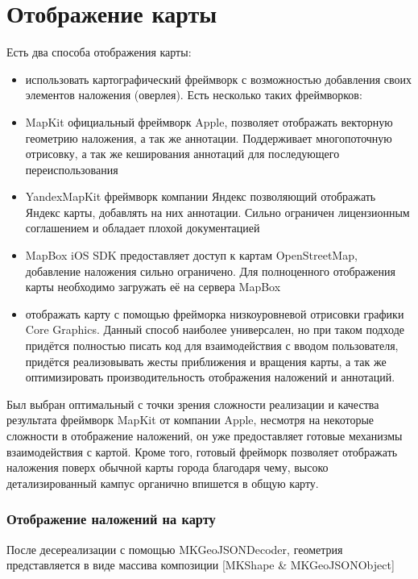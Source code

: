   \section{Отображение карты}
    Есть два способа отображения карты:
    \begin{itemize}
      \item использовать картографический фреймворк с возможностью добавления своих элементов наложения (оверлея). Есть несколько таких фреймворков:
      \item MapKit официальный фреймворк Apple, позволяет отображать векторную геометрию наложения, а так же аннотации. Поддерживает многопоточную отрисовку, а так же кеширования аннотаций для последующего переиспользования
      \item YandexMapKit фреймворк компании Яндекс позволяющий отображать Яндекс карты, добавлять на них аннотации. Сильно ограничен лицензионным соглашением и обладает плохой документацией
      \item MapBox iOS SDK предоставляет доступ к картам OpenStreetMap, добавление наложения сильно ограничено. Для полноценного отображения карты необходимо загружать её на сервера MapBox
      \item отображать карту с помощью фрейморка низкоуровневой отрисовки графики Core Graphics. Данный способ наиболее универсален, но при таком подходе придётся полностью писать код для взаимодействия с вводом пользователя, придётся реализовывать жесты приближения и вращения карты, а так же оптимизировать производительность отображения наложений и аннотаций.
    \end{itemize}


    Был выбран оптимальный с точки зрения сложности реализации и качества результата фреймворк MapKit от компании Apple, несмотря на некоторые сложности в отображение наложений, он уже предоставляет готовые механизмы взаимодействия с картой. Кроме того, готовый фрейморк позволяет отображать наложения поверх обычной карты города благодаря чему, высоко детализированный кампус органично впишется в общую карту.

    \subsubsection{Отображение наложений на карту}
      После десереализации с помощью MKGeoJSONDecoder, геометрия представляется в виде массива композиции [MKShape \& MKGeoJSONObject]


